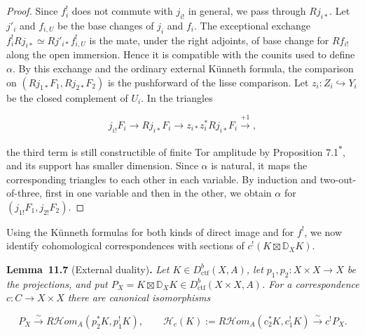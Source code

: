 \documentclass[11pt]{article}
\newenvironment{bpstatement}[2]{\par\addvspace{0.6\baselineskip}\noindent\textbf{#1}#2\textbf{.}\enspace\ignorespaces}
  {\par\addvspace{0.4\baselineskip}}
\newenvironment{bpstatementit}[2]{\begin{bpstatement}{#1}{#2}\itshape\ignorespaces}{\end{bpstatement}}
\newcommand{\bpout}[1]{#1\textsuperscript{\hyperlink{bp-outside}{\ensuremath{\ast}}}}
\providecommand{\cHom}{}\renewcommand{\cHom}{R\mathcal{H}\!om}
\begin{document}
\begin{proof}[{Proof}]
Since \(f_i^!\) does not commute with \(j_{i!}\) in general, we pass through \(Rj_{i*}\). Let \(j'_i\) and \(f_{i,U}\) be the base changes of \(j_i\) and \(f_i\). The exceptional exchange \(f_i^!Rj_{i*}\simeq Rj'_{i*}f_{i,U}^!\) is the mate, under the right adjoints, of base change for \(Rf_{i!}\) along the open immersion. Hence it is compatible with the counits used to define \(\alpha\). By this exchange and the ordinary external Künneth formula, the comparison on \((Rj_{1*}F_1,Rj_{2*}F_2)\) is the pushforward of the lisse comparison. Let \(z_i:Z_i\hookrightarrow Y_i\) be the closed complement of \(U_i\). In the triangles

\[
j_{i!}F_i\longrightarrow Rj_{i*}F_i\longrightarrow
z_{i*}z_i^*Rj_{i*}F_i\xrightarrow{+1},
\]

the third term is still constructible of finite Tor amplitude by Proposition \bpout{7.1}, and its support has smaller dimension. Since \(\alpha\) is natural, it maps the corresponding triangles to each other in each variable. By induction and two-out-of-three, first in one variable and then in the other, we obtain \(\alpha\) for \((j_{1!}F_1,j_{2!}F_2)\).
\end{proof}

\label{bp21}%
Using the Künneth formulas for both kinds of direct image and for \(f^!\), we now identify cohomological correspondences with sections of \(c^!(K\boxtimes\mathbb D_XK)\).

\label{bp22}%
\begin{bpstatementit}{Lemma~11.7}{ (External duality)}
Let \(K\in D^b_{\mathrm{ctf}}(X,A)\), let \(p_1,p_2:X\times X\to X\) be the projections, and put \(P_X=K\boxtimes \mathbb D_XK\in D^b_{\mathrm{ctf}}(X\times X,A)\). For a correspondence \(c:C\to X\times X\) there are canonical isomorphisms

\[
P_X\xrightarrow{\sim}\cHom_A(p_2^*K,p_1^!K),
\qquad
\mathcal H_c(K):=\cHom_A(c_2^*K,c_1^!K)
\xrightarrow{\sim}c^!P_X.
\]
\end{bpstatementit}
\end{document}
